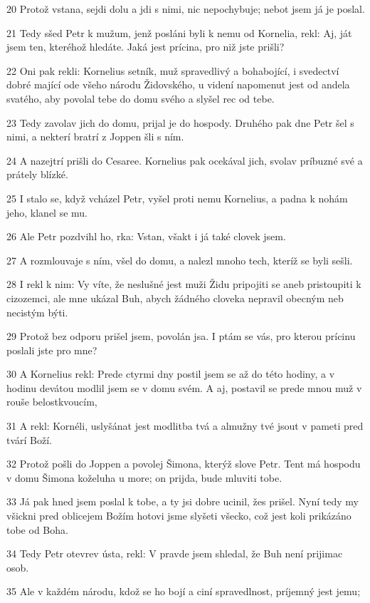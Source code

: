 \par 20 Protož vstana, sejdi dolu a jdi s nimi, nic nepochybuje; nebot jsem já je poslal.
\par 21 Tedy sšed Petr k mužum, jenž posláni byli k nemu od Kornelia, rekl: Aj, ját jsem ten, kteréhož hledáte. Jaká jest prícina, pro niž jste prišli?
\par 22 Oni pak rekli: Kornelius setník, muž spravedlivý a bohabojící, i svedectví dobré mající ode všeho národu Židovského, u videní napomenut jest od andela svatého, aby povolal tebe do domu svého a slyšel rec od tebe.
\par 23 Tedy zavolav jich do domu, prijal je do hospody. Druhého pak dne Petr šel s nimi, a nekterí bratrí z Joppen šli s ním.
\par 24 A nazejtrí prišli do Cesaree. Kornelius pak ocekával jich, svolav príbuzné své a prátely blízké.
\par 25 I stalo se, když vcházel Petr, vyšel proti nemu Kornelius, a padna k nohám jeho, klanel se mu.
\par 26 Ale Petr pozdvihl ho, rka: Vstan, všakt i já také clovek jsem.
\par 27 A rozmlouvaje s ním, všel do domu, a nalezl mnoho tech, kteríž se byli sešli.
\par 28 I rekl k nim: Vy víte, že neslušné jest muži Židu pripojiti se aneb pristoupiti k cizozemci, ale mne ukázal Buh, abych žádného cloveka nepravil obecným neb necistým býti.
\par 29 Protož bez odporu prišel jsem, povolán jsa. I ptám se vás, pro kterou prícinu poslali jste pro mne?
\par 30 A Kornelius rekl: Prede ctyrmi dny postil jsem se až do této hodiny, a v hodinu devátou modlil jsem se v domu svém. A aj, postavil se prede mnou muž v rouše belostkvoucím,
\par 31 A rekl: Kornéli, uslyšánat jest modlitba tvá a almužny tvé jsout v pameti pred tvárí Boží.
\par 32 Protož pošli do Joppen a povolej Šimona, kterýž slove Petr. Tent má hospodu v domu Šimona koželuha u more; on prijda, bude mluviti tobe.
\par 33 Já pak hned jsem poslal k tobe, a ty jsi dobre ucinil, žes prišel. Nyní tedy my všickni pred oblicejem Božím hotovi jsme slyšeti všecko, což jest koli prikázáno tobe od Boha.
\par 34 Tedy Petr otevrev ústa, rekl: V pravde jsem shledal, že Buh není prijimac osob.
\par 35 Ale v každém národu, kdož se ho bojí a ciní spravedlnost, príjemný jest jemu;

